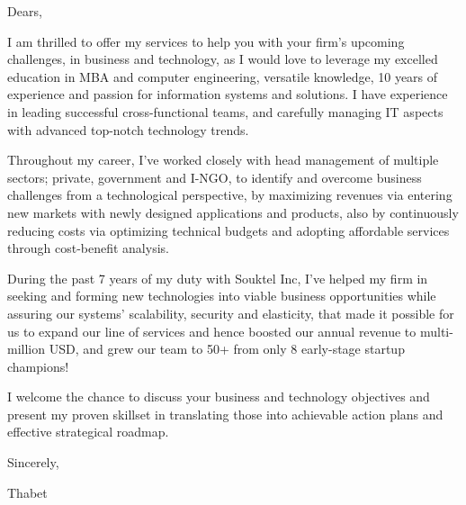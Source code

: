\vspace{20mm}
\vspace{10mm}


\begin{cvletter}

Dears,

I am thrilled to offer my services to help you with your firm’s upcoming challenges, in business and technology, as I would love to leverage my excelled education in MBA and computer engineering, versatile knowledge, 10 years of experience and passion for information systems and solutions. I have experience in leading successful cross-functional teams, and carefully managing IT aspects with advanced top-notch technology trends.

Throughout my career, I've worked closely with head management of multiple sectors; private, government and I-NGO, to identify and overcome business challenges from a technological perspective, by maximizing revenues via entering new markets with newly designed applications and products, also by continuously reducing costs via optimizing technical budgets and adopting affordable services through cost-benefit analysis.

During the past 7 years of my duty with Souktel Inc, I've helped my firm in seeking and forming new technologies into viable business opportunities while assuring our systems’ scalability, security and elasticity, that made it possible for us to expand our line of services and hence boosted our annual revenue to multi-million USD, and grew our team to 50+ from only 8 early-stage startup champions!

I welcome the chance to discuss your business and technology objectives and present my proven skillset in translating those into
achievable action plans and effective strategical roadmap.

Sincerely,

Thabet
\end{cvletter}

